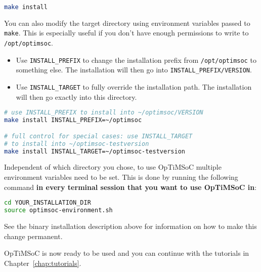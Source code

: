 \begin{lstlisting}[language=sh]
make install
\end{lstlisting}

You can also modify the target directory using environment variables passed to
\verb|make|. This is especially useful if you don't have enough permissions to
write to \verb|/opt/optimsoc|.

\begin{itemize}
  \item Use \verb|INSTALL_PREFIX| to change the installation prefix from
    \verb|/opt/optimsoc| to something else. The installation will then go
    into \verb|INSTALL_PREFIX/VERSION|.
  \item Use \verb|INSTALL_TARGET| to fully override the installation path.
    The installation will then go exactly into this directory.
\end{itemize}

\begin{lstlisting}[language=sh]
# use INSTALL_PREFIX to install into ~/optimsoc/VERSION
make install INSTALL_PREFIX=~/optimsoc

# full control for special cases: use INSTALL_TARGET
# to install into ~/optimsoc-testversion
make install INSTALL_TARGET=~/optimsoc-testversion
\end{lstlisting}


Independent of which directory you chose, to use OpTiMSoC multiple environment variables need to be set.
This is done by running the following command \textbf{in every terminal session that you want to use OpTiMSoC in}:

\begin{lstlisting}[language=sh]
cd YOUR_INSTALLATION_DIR
source optimsoc-environment.sh
\end{lstlisting}

See the binary installation description above for information on how to make this change permanent.

\medskip
OpTiMSoC is now ready to be used and you can continue with the tutorials in Chapter~\ref{chap:tutorials}.
